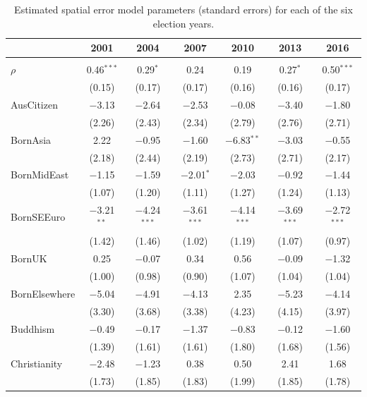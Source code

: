 \documentclass[11pt,a4paper,]{article}
\begin{document}
\begin{table}[!htbp] \centering
  \caption{Estimated spatial error model parameters (standard errors) for each of the six election years.}
  \label{}
\scriptsize
\begin{tabular}{@{\extracolsep{1pt}}lcccccc}
\\[-1.8ex]\hline
 & 2001 & 2004 & 2007 & 2010 & 2013 & 2016 \\
\hline \\[-1.8ex]
 $\rho$ & 0.46$^{***}$ & 0.29$^{*}$ & 0.24 & 0.19 & 0.27$^{*}$ & 0.50$^{***}$ \\
  & (0.15) & (0.17) & (0.17) & (0.16) & (0.16) & (0.17) \\

 AusCitizen & $-$3.13 & $-$2.64 & $-$2.53 & $-$0.08 & $-$3.40 & $-$1.80 \\
  & (2.26) & (2.43) & (2.34) & (2.79) & (2.76) & (2.71) \\

 BornAsia & 2.22 & $-$0.95 & $-$1.60 & $-$6.83$^{**}$ & $-$3.03 & $-$0.55 \\
  & (2.18) & (2.44) & (2.19) & (2.73) & (2.71) & (2.17) \\

 BornMidEast & $-$1.15 & $-$1.59 & $-$2.01$^{*}$ & $-$2.03 & $-$0.92 & $-$1.44 \\
  & (1.07) & (1.20) & (1.11) & (1.27) & (1.24) & (1.13) \\

 BornSEEuro & $-$3.21$^{**}$ & $-$4.24$^{***}$ & $-$3.61$^{***}$ & $-$4.14$^{***}$ & $-$3.69$^{***}$ & $-$2.72$^{***}$ \\
  & (1.42) & (1.46) & (1.02) & (1.19) & (1.07) & (0.97) \\

 BornUK & 0.25 & $-$0.07 & 0.34 & 0.56 & $-$0.09 & $-$1.32 \\
  & (1.00) & (0.98) & (0.90) & (1.07) & (1.04) & (1.04) \\

 BornElsewhere & $-$5.04 & $-$4.91 & $-$4.13 & 2.35 & $-$5.23 & $-$4.14 \\
  & (3.30) & (3.68) & (3.38) & (4.23) & (4.15) & (3.97) \\

 Buddhism & $-$0.49 & $-$0.17 & $-$1.37 & $-$0.83 & $-$0.12 & $-$1.60 \\
  & (1.39) & (1.61) & (1.61) & (1.80) & (1.68) & (1.56) \\

 Christianity & $-$2.48 & $-$1.23 & 0.38 & 0.50 & 2.41 & 1.68 \\
  & (1.73) & (1.85) & (1.83) & (1.99) & (1.85) & (1.78) \\


\end{tabular}
\end{table}
\end{document}
